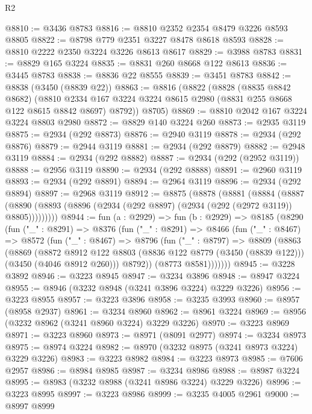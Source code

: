 \begin{lexlean}{R2}
\begin{coremodule}
@8810 := @3436 @8783
@8816 := @8810 @2352 @2354 @8479 @3226 @8593 @8805
@8822 := @8798 @779 @2351 @3227 @8478 @8618 @8593
@8828 := @8810 @2222 @2350 @3224 @3226 @8613 @8617
@8829 := @3988 @8783
@8831 := @8829 @165 @3224
@8835 := @8831 @260 @8668 @122 @8613
@8836 := @3445 @8783
@8838 := @8836 @22 @8555
@8839 := @3451 @8783
@8842 := @8838 (@3450 (@8839 @22))
@8863 := @8816
    (@8822
      (@8828
        (@8835 @8842 @8682)
        (@8810 @2334 @167 @3224 @3224 @8615 @2980 (@8831 @255 @8668 @122 @8615 @8842 @8697) @8792))
      @8705)
@8869 := @8810 @2042 @167 @3224 @3224 @8803 @2980
@8872 := @8829 @140 @3224 @260
@8873 := @2935 @3119
@8875 := @2934 (@292 @8873)
@8876 := @2940 @3119
@8878 := @2934 (@292 @8876)
@8879 := @2944 @3119
@8881 := @2934 (@292 @8879)
@8882 := @2948 @3119
@8884 := @2934 (@292 @8882)
@8887 := @2934 (@292 (@2952 @3119))
@8888 := @2956 @3119
@8890 := @2934 (@292 @8888)
@8891 := @2960 @3119
@8893 := @2934 (@292 @8891)
@8894 := @2964 @3119
@8896 := @2934 (@292 @8894)
@8897 := @2968 @3119
@8912 := @8875
    (@8878
      (@8881
        (@8884
          (@8887 (@8890 (@8893 (@8896 (@2934 (@292 @8897) (@2934 (@292 (@2972 @3119)) @8805)))))))))
@8944 := fun (a : @2929) =>
  fun (b : @2929) =>
  @8185
    (@8290
      (fun ("_" : @8291) =>
      @8376
        (fun ("_" : @8291) =>
        @8466
          (fun ("_" : @8467) =>
          @8572
            (fun ("_" : @8467) =>
            @8796
              (fun ("_" : @8797) =>
              @8809
                (@8863
                  (@8869
                    (@8872
                      @8912
                      @122
                      @8803
                      (@8836 @122 @8779 (@3450 (@8839 @122)))
                      (@3450 (@4046 @8912 @260)))
                    @8792))
                (@8773 @8581)))))))
@8945 := @3228 @3892
@8946 := @3223 @8945
@8947 := @3234 @3896
@8948 := @8947 @3224
@8955 := @8946 (@3232 @8948 (@3241 @3896 @3224) @3229 @3226)
@8956 := @3223 @8955
@8957 := @3223 @3896
@8958 := @3235 @3993
@8960 := @8957 (@8958 @2937)
@8961 := @3234 @8960
@8962 := @8961 @3224
@8969 := @8956 (@3232 @8962 (@3241 @8960 @3224) @3229 @3226)
@8970 := @3223 @8969
@8971 := @3223 @8960
@8973 := @8971 (@8091 @2977)
@8974 := @3234 @8973
@8975 := @8974 @3224
@8982 := @8970 (@3232 @8975 (@3241 @8973 @3224) @3229 @3226)
@8983 := @3223 @8982
@8984 := @3223 @8973
@8985 := @7606 @2957
@8986 := @8984 @8985
@8987 := @3234 @8986
@8988 := @8987 @3224
@8995 := @8983 (@3232 @8988 (@3241 @8986 @3224) @3229 @3226)
@8996 := @3223 @8995
@8997 := @3223 @8986
@8999 := @3235 @4005 @2961
@9000 := @8997 @8999

\end{coremodule}
\end{lexlean}
